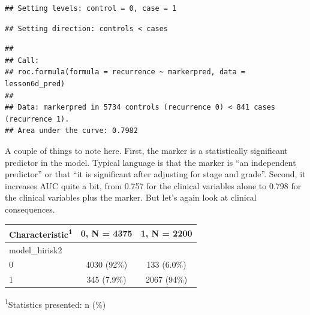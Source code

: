 \documentclass[]{book}
\newenvironment{Shaded}{\begin{snugshade}}{\end{snugshade}}
\newcommand{\CommentTok}[1]{\textcolor[rgb]{0.56,0.35,0.01}{\textit{#1}}}
\newcommand{\DataTypeTok}[1]{\textcolor[rgb]{0.13,0.29,0.53}{#1}}
\newcommand{\DecValTok}[1]{\textcolor[rgb]{0.00,0.00,0.81}{#1}}
\newcommand{\FloatTok}[1]{\textcolor[rgb]{0.00,0.00,0.81}{#1}}
\newcommand{\KeywordTok}[1]{\textcolor[rgb]{0.13,0.29,0.53}{\textbf{#1}}}
\newcommand{\NormalTok}[1]{#1}
\newcommand{\OperatorTok}[1]{\textcolor[rgb]{0.81,0.36,0.00}{\textbf{#1}}}
\newcommand{\StringTok}[1]{\textcolor[rgb]{0.31,0.60,0.02}{#1}}
\begin{document}
\begin{verbatim}
## Setting levels: control = 0, case = 1
\end{verbatim}

\begin{verbatim}
## Setting direction: controls < cases
\end{verbatim}

\begin{verbatim}
## 
## Call:
## roc.formula(formula = recurrence ~ markerpred, data = lesson6d_pred)
## 
## Data: markerpred in 5734 controls (recurrence 0) < 841 cases (recurrence 1).
## Area under the curve: 0.7982
\end{verbatim}

A couple of things to note here. First, the marker is a statistically significant predictor in the model. Typical language is that the marker is ``an independent predictor'' or that ``it is significant after adjusting for stage and grade''. Second, it increases AUC quite a bit, from 0.757 for the clinical variables alone to 0.798 for the clinical variables plus the marker. But let's again look at clinical consequences.

\begin{Shaded}
\end{Shaded}

\captionsetup[table]{labelformat=empty,skip=1pt}
\begin{longtable}{lcc}
\toprule
\textbf{Characteristic}\textsuperscript{1} & \textbf{0}, N = 4375 & \textbf{1}, N = 2200 \\ 
\midrule
model\_hirisk2 &  &  \\ 
0 & 4030 (92\%) & 133 (6.0\%) \\ 
1 & 345 (7.9\%) & 2067 (94\%) \\ 
\bottomrule
\end{longtable}
\vspace{-5mm}
\begin{minipage}{\linewidth}
\textsuperscript{1}Statistics presented: n (\%) \\ 
\end{minipage}
\end{document}
